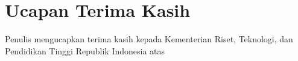 \section{Ucapan Terima Kasih}
\label{sec:ucapanterimakasih}

Penulis mengucapkan terima kasih kepada Kementerian Riset, Teknologi, dan Pendidikan Tinggi Republik Indonesia atas \lipsum[1]